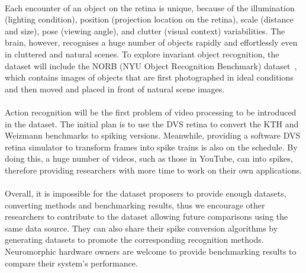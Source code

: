 \DIFaddbegin \paragraph{}
\DIFaddend %
Each encounter of an object on the retina is unique, because of the illumination (lighting condition), position (projection location on the retina), scale (distance and size), pose (viewing angle), and clutter (visual context) variabilities.
The brain, however, recognises a huge number of objects rapidly and effortlessly even in cluttered and natural scenes.
To explore invariant object recognition, the dataset will include the NORB (NYU Object Recognition Benchmark) dataset~\citep{lecun2004learning}, which contains images of objects that are first photographed in ideal conditions and then moved and placed in front of natural scene images.

\DIFaddbegin \paragraph{}
\DIFaddend Action recognition will be the first problem of video processing to be introduced in the dataset.
The initial plan is to use the DVS retina to convert the KTH and Weizmann benchmarks to spiking versions.
Meanwhile, providing a software DVS retina simulator to transform frames into spike trains is also on the schedule.
By doing this, a huge number of videos, such as those in YouTube, can \DIFdelbegin {}\DIFdelend \DIFaddbegin {}\DIFaddend into spikes, therefore providing researchers with more time to work on their own applications.

\DIFaddbegin \paragraph{}
\DIFaddend Overall, it is impossible for the dataset proposers to provide enough datasets, converting methods and benchmarking results, thus we encourage other researchers to contribute to the dataset allowing future comparisons using the same data source.
They can also share their spike conversion algorithms by generating datasets to promote the corresponding recognition methods.
Neuromorphic hardware owners are welcome to provide benchmarking results to compare their system's performance.

